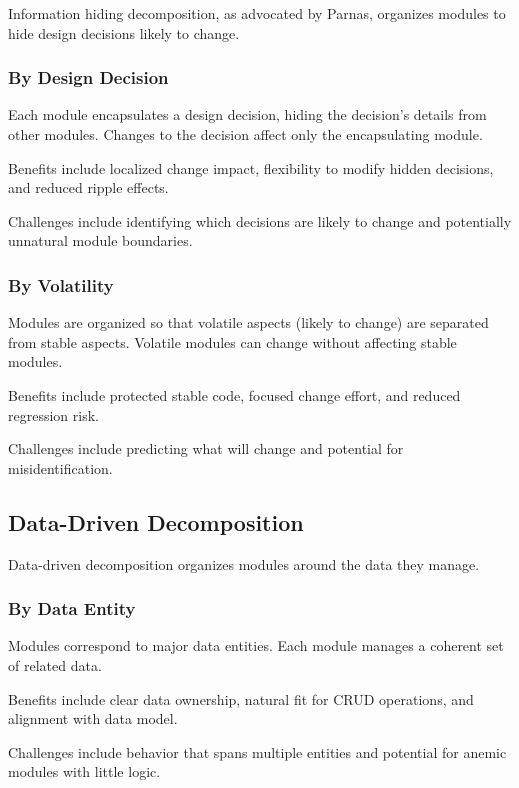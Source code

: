 \documentclass[11pt]{article}
\begin{document}
Information hiding decomposition, as advocated by Parnas, organizes modules to hide design decisions likely to change.

\subsubsection{By Design Decision}

Each module encapsulates a design decision, hiding the decision's details from other modules. Changes to the decision affect only the encapsulating module.

Benefits include localized change impact, flexibility to modify hidden decisions, and reduced ripple effects.

Challenges include identifying which decisions are likely to change and potentially unnatural module boundaries.

\subsubsection{By Volatility}

Modules are organized so that volatile aspects (likely to change) are separated from stable aspects. Volatile modules can change without affecting stable modules.

Benefits include protected stable code, focused change effort, and reduced regression risk.

Challenges include predicting what will change and potential for misidentification.

\subsection{Data-Driven Decomposition}

Data-driven decomposition organizes modules around the data they manage.

\subsubsection{By Data Entity}

Modules correspond to major data entities. Each module manages a coherent set of related data.

Benefits include clear data ownership, natural fit for CRUD operations, and alignment with data model.

Challenges include behavior that spans multiple entities and potential for anemic modules with little logic.
\end{document}
